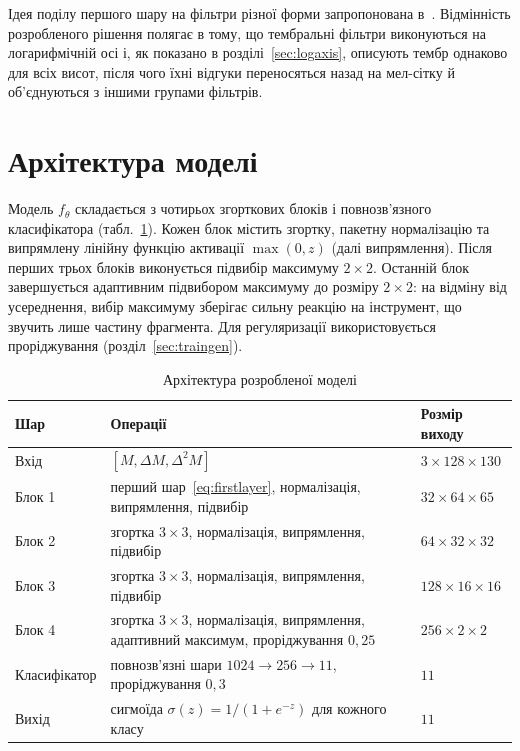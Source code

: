 Ідея поділу першого шару на фільтри різної форми запропонована
в~\cite{pons2017}. Відмінність розробленого рішення полягає в тому, що
тембральні фільтри виконуються на логарифмічній осі і, як показано в
розділі~\ref{sec:logaxis}, описують тембр однаково для всіх
висот, після чого їхні відгуки переносяться назад на мел-сітку й
об'єднуються з іншими групами фільтрів.

\section{Архітектура моделі}
\label{sec:arch}

Модель $f_\theta$ складається з чотирьох згорткових блоків і
повнозв'язного класифікатора (табл.~\ref{tab:arch}). Кожен блок містить
згортку, пакетну нормалізацію та випрямлену лінійну функцію активації
$\max(0, z)$ (далі випрямлення). Після перших трьох блоків виконується
підвибір максимуму $2 \times 2$. Останній блок завершується адаптивним
підвибором максимуму до розміру $2 \times 2$: на відміну від усереднення,
вибір максимуму зберігає сильну реакцію на інструмент, що звучить лише
частину фрагмента. Для регуляризації використовується проріджування
(розділ~\ref{sec:traingen}).

\begin{table}[H]
\centering
\caption{Архітектура розробленої моделі}
\label{tab:arch}
\small
\begin{tabular}{|p{2.6cm}|p{9.0cm}|p{3.2cm}|}
\hline
Шар & Операції & Розмір виходу \\
\hline
Вхід & $[M, \Delta M, \Delta^2 M]$ & $3 \times 128 \times 130$ \\
Блок 1 & перший шар~\eqref{eq:firstlayer}, нормалізація, випрямлення, підвибір & $32 \times 64 \times 65$ \\
Блок 2 & згортка $3\times 3$, нормалізація, випрямлення, підвибір & $64 \times 32 \times 32$ \\
Блок 3 & згортка $3\times 3$, нормалізація, випрямлення, підвибір & $128 \times 16 \times 16$ \\
Блок 4 & згортка $3\times 3$, нормалізація, випрямлення, адаптивний максимум, проріджування $0{,}25$ & $256 \times 2 \times 2$ \\
Класифікатор & повнозв'язні шари $1024 \to 256 \to 11$, проріджування $0{,}3$ & $11$ \\
Вихід & сигмоїда $\sigma(z) = 1/(1 + e^{-z})$ для кожного класу & $11$ \\
\hline
\end{tabular}
\end{table}

